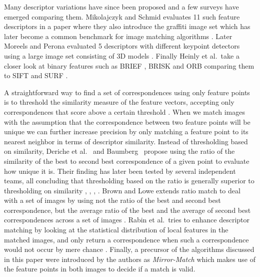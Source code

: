 \documentclass[journal]{IEEEtran}
\begin{document}
Many descriptor variations have since been proposed and a few surveys 
have emerged comparing them. Mikolajczyk and Schmid evaluates 11 such 
feature descriptors in a paper where they also introduce the graffiti 
image set which has later become a common benchmark for image matching 
algorithms \cite{mikolajczyk2005performance}.  Later Moreels and Perona 
evaluated 5 descriptors with different keypoint detectors using a large 
image set consisting of 3D models \cite{moreels2007evaluation}. Finally 
Heinly et al.\ take a closer look at binary features such as BRIEF 
\cite{calonder2010brief}, BRISK \cite{leutenegger2011brisk} and ORB 
\cite{rublee2011orb} comparing them to SIFT and SURF 
\cite{heinly2012comparative}. 

A straightforward way to find a set of correspondences using only 
feature points is to threshold the similarity measure of the feature 
vectors, accepting only correspondences that score above a certain 
threshold \cite{szeliski2010}. When we match images with the assumption 
that the correspondence between two feature points will be unique we can 
further increase precision by only matching a feature point to its 
nearest neighbor in terms of descriptor similarity. Instead of 
thresholding based on similarity, Deriche et 
al.~\cite{deriche1994robust} and Baumberg~\cite{baumberg2000reliable} 
propose using the ratio of the similarity of the best to second best 
correspondence of a given point to evaluate how unique it is. Their 
finding has later been tested by several independent teams, all 
concluding that thresholding based on the ratio is generally superior to 
thresholding on similarity \cite{lowe2004sift}, 
\cite{mikolajczyk2005performance}, \cite{moreels2007evaluation}, 
\cite{rabin2009statistical}. Brown and Lowe extends ratio match to deal 
with a set of images by using not the ratio of the best and second best 
correspondence, but the average ratio of the best and the average of 
second best correspondences across a set of images 
\cite{brown2005multi}.  Rabin et al.\ tries to enhance descriptor 
matching by looking at the statistical distribution of local features in 
the matched images, and only return a correspondence when such a 
correspondence would not occur by mere chance 
\cite{rabin2009statistical}. Finally, a precursor of the algorithms 
discussed in this paper were introduced by the authors as 
\emph{Mirror-Match} \cite{arnfred2013mirror} which makes use of the 
feature points in both images to decide if a match is valid.
\end{document}
